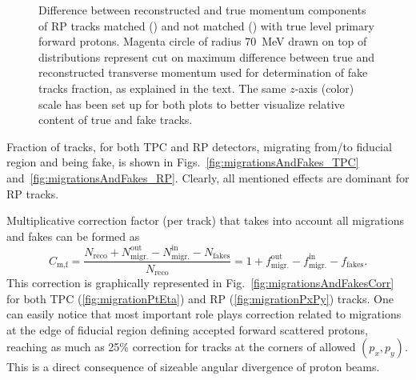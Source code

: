 \begin{figure}
{}%
\caption[Difference between reconstructed and true momentum components of RP tracks.]{Difference between reconstructed and true momentum components of RP tracks matched () and not matched () with true level primary forward protons. Magenta circle of radius 70~MeV drawn on top of distributions represent cut on maximum difference between true and reconstructed transverse momentum used for determination of fake tracks fraction, as explained in the text. The same $z$-axis (color) scale has been set up for both plots to better visualize relative content of true and fake tracks.} \label{fig:DeltaPyVsDeltaPx}
\end{figure}


Fraction of tracks, for both TPC and RP detectors, migrating from/to fiducial region and being fake, is shown in Figs.~\ref{fig:migrationsAndFakes_TPC} and~\ref{fig:migrationsAndFakes_RP}. Clearly, all mentioned effects are dominant for RP tracks.



Multiplicative correction factor (per track) that takes into account all migrations and fakes can be formed as
\begin{equation}
 C_{\text{m,f}} = \frac{N_{\textrm{reco}} + N_{\textrm{migr.}}^{\textrm{out}} - N_{\textrm{migr.}}^{\textrm{in}} - N_{\textrm{fakes}}}{N_{\textrm{reco}}} = 1 + f_{\text{migr.}}^{\text{out}} - f_{\text{migr.}}^{\text{in}} - f_{\text{fakes}}.
\end{equation}
This correction is graphically represented in Fig.~\ref{fig:migrationsAndFakesCorr} for both TPC (\ref{fig:migrationPtEta}) and RP (\ref{fig:migrationPxPy}) tracks. One can easily notice that most important role plays correction related to migrations at the edge of fiducial region defining accepted forward scattered protons, reaching as much as 25\% correction for tracks at the corners of allowed $(p_{x}, p_{y})$. This is a direct consequence of sizeable angular divergence of proton beams.


